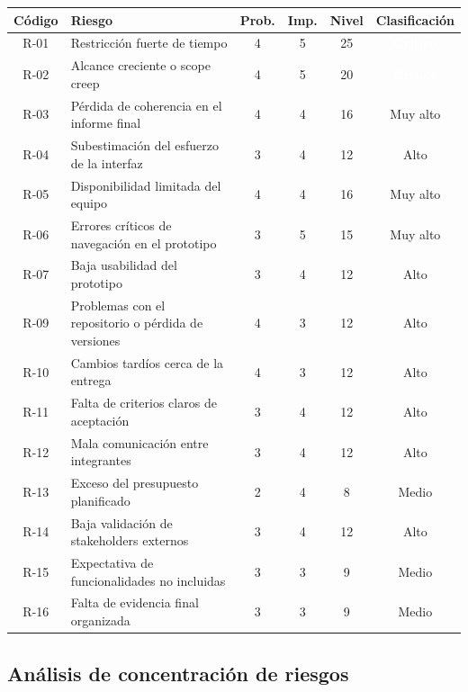 \documentclass[11pt,spanish]{article}
\begin{document}
\begin{table}[H]
\centering
\begin{tabularx}{\textwidth}{c Y c c c c}
\toprule
\textbf{Código} & \textbf{Riesgo} & \textbf{Prob.} & \textbf{Imp.} & \textbf{Nivel} & \textbf{Clasificación} \\
\midrule
R-01 & Restricción fuerte de tiempo & 4 & 5 & 25 & \textcolor{white}{\textbf{Crítico}} \\
R-02 & Alcance creciente o scope creep & 4 & 5 & 20 & \textcolor{white}{\textbf{Crítico}} \\
R-03 & Pérdida de coherencia en el informe final & 4 & 4 & 16 &  Muy alto \\
R-04 & Subestimación del esfuerzo de la interfaz & 3 & 4 & 12 &  Alto \\
R-05 & Disponibilidad limitada del equipo & 4 & 4 & 16 &  Muy alto \\
R-06 & Errores críticos de navegación en el prototipo & 3 & 5 & 15 &  Muy alto \\
R-07 & Baja usabilidad del prototipo & 3 & 4 & 12 &  Alto \\

R-09 & Problemas con el repositorio o pérdida de versiones & 4 & 3 & 12 &  Alto \\
R-10 & Cambios tardíos cerca de la entrega & 4 & 3 & 12 &  Alto \\
R-11 & Falta de criterios claros de aceptación & 3 & 4 & 12 &  Alto \\
R-12 & Mala comunicación entre integrantes & 3 & 4 & 12 &  Alto \\
R-13 & Exceso del presupuesto planificado & 2 & 4 & 8 &  Medio \\
R-14 & Baja validación de stakeholders externos & 3 & 4 & 12 &  Alto \\
R-15 & Expectativa de funcionalidades no incluidas & 3 & 3 & 9 &  Medio \\
R-16 & Falta de evidencia final organizada & 3 & 3 & 9 &  Medio \\
\bottomrule
\end{tabularx}
\end{table}

\subsection{Análisis de concentración de riesgos}
\end{document}
